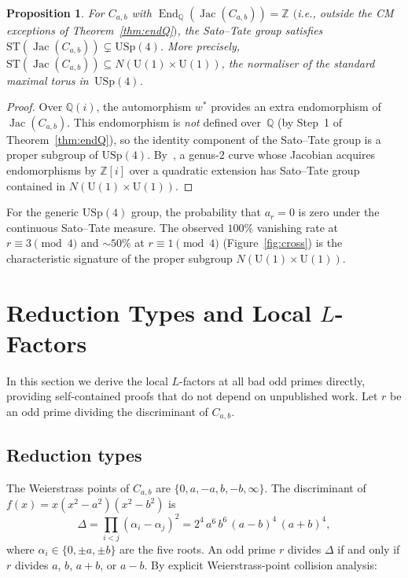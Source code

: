 \documentclass[11pt,a4paper]{article}
\newcommand{\Jac}{\operatorname{Jac}}
\newcommand{\End}{\operatorname{End}}
\newcommand{\USp}{\mathrm{USp}}
\newtheorem{proposition}[theorem]{Proposition}
\theoremstyle{definition}
\theoremstyle{remark}
\begin{document}
\begin{proposition}\label{prop:ST}
  For $C_{a,b}$ with $\End_{\mathbb{Q}}(\Jac(C_{a,b})) = \mathbb{Z}$
  $($i.e., outside the CM exceptions of Theorem~\ref{thm:endQ}$)$,
  the Sato--Tate group satisfies
  $\mathrm{ST}(\Jac(C_{a,b})) \subsetneq \USp(4)$.
  More precisely, $\mathrm{ST}(\Jac(C_{a,b})) \subseteq
  N(\mathrm{U}(1) \times \mathrm{U}(1))$,
  the normaliser of the standard maximal torus in~$\USp(4)$.
\end{proposition}

\begin{proof}
  Over $\mathbb{Q}(i)$, the automorphism $w^*$ provides an extra
  endomorphism of $\Jac(C_{a,b})$.
  This endomorphism is \emph{not} defined over~$\mathbb{Q}$
  (by Step~1 of Theorem~\ref{thm:endQ}), so the identity component
  of the Sato--Tate group is a proper subgroup of $\USp(4)$.
  By~\cite[Table~1]{FKRS}, a genus-$2$ curve whose Jacobian
  acquires endomorphisms by $\mathbb{Z}[i]$ over a quadratic
  extension has Sato--Tate group contained in
  $N(\mathrm{U}(1) \times \mathrm{U}(1))$.
\end{proof}

For the generic $\USp(4)$ group, the probability that $a_r = 0$
is zero under the continuous Sato--Tate measure.
The observed $100\%$ vanishing rate at $r \equiv 3 \pmod 4$ and
$\sim\!50\%$ at $r \equiv 1 \pmod 4$ (Figure~\ref{fig:cross})
is the characteristic signature of the proper subgroup
$N(\mathrm{U}(1) \times \mathrm{U}(1))$.


\section{Reduction Types and Local $L$-Factors}\label{sec:local}

In this section we derive the local $L$-factors at all bad odd
primes directly, providing self-contained proofs that do not
depend on unpublished work.
Let $r$ be an odd prime dividing the discriminant of $C_{a,b}$.

\subsection{Reduction types}

The Weierstrass points of $C_{a,b}$ are $\{0, a, -a, b, -b, \infty\}$.
The discriminant of $f(x) = x(x^2-a^2)(x^2-b^2)$ is
\begin{equation}\label{eq:disc}
  \Delta = \prod_{i < j}(\alpha_i - \alpha_j)^2
  = 2^4\, a^6\, b^6\, (a - b)^4\, (a + b)^4,
\end{equation}
where $\alpha_i \in \{0, \pm a, \pm b\}$ are the five roots.
An odd prime $r$ divides $\Delta$ if and only if $r$ divides
$a$, $b$, $a + b$, or $a - b$.
By explicit Weierstrass-point collision analysis:
\end{document}
